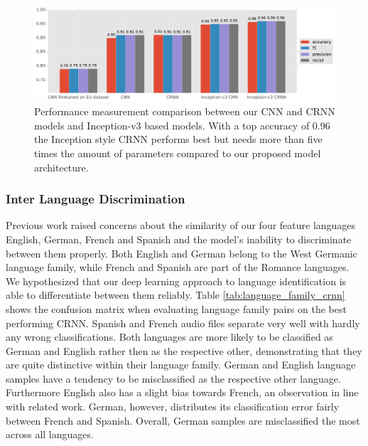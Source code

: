 	\begin{figure}[]
  		\centering
    	\includegraphics[width=\textwidth, keepaspectratio]{plots/results_news_plot.pdf}
    	\caption{Performance measurement comparison between our CNN and CRNN models and Inception-v3 based models. With a top accuracy of 0.96 the Inception style CRNN performs best but needs more than five times the amount of parameters compared to our proposed model architecture.}
    	\label{fig:news_results}
	\end{figure}
	


\subsubsection{Inter Language Discrimination} 
\label{sec:lang_discrimination}

Previous work\cite{montavon2009deep} raised concerns about the similarity of our four feature languages \textendash{} English, German, French and Spanish \textendash{} and the model's inability to discriminate between them properly. Both English and German belong to the West Germanic language family, while French and Spanish are part of the Romance languages. We hypothesized that our deep learning approach to language identification is able to differentiate between them reliably. 
Table \ref{tab:language_family_crnn} shows the confusion matrix when evaluating language family pairs on the best performing CRNN. Spanish and French audio files separate very well with hardly any wrong classifications. Both languages are more likely to be classified as German and English rather then as the respective other, demonstrating that they are quite distinctive within their language family. 
German and English language samples have a tendency to be misclassified as the respective other language. Furthermore English also has a slight bias towards French, an observation in line with related work\cite{werkmeister2016practical}. German, however, distributes its classification error fairly between French and Spanish. Overall, German samples are misclassified the most across all languages.
 	
